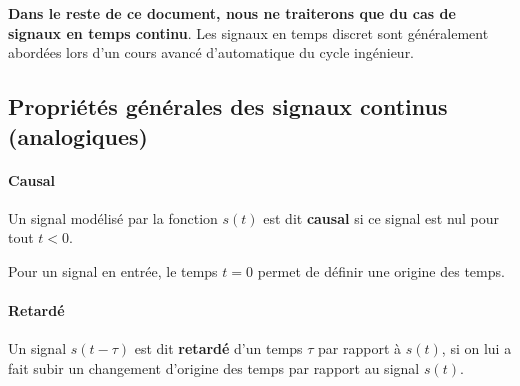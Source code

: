\textbf{Dans le reste de ce document, nous ne traiterons que
du cas de signaux en temps continu}. Les signaux en temps discret
sont généralement abordées lors d'un cours 
avancé d'automatique du cycle ingénieur.

\newpage
\subsection{Propriétés générales des signaux continus (analogiques)}

\paragraph{Causal}

Un signal modélisé par la fonction $s(t)$ est dit \textbf{causal}
si ce signal est nul pour tout $t<0$. 
{
\begin{figure}[htb]
\centering
{}

\end{figure}
\setlength\intextsep{0pt}
}
Pour un signal en entrée, le temps $t=0$ permet de 
définir une origine des temps.

%

%

%

\paragraph{Retardé}
Un signal $s(t-\tau)$ est dit \textbf{retardé} d'un temps $\tau$ 
par rapport à $s(t)$, si on lui a fait subir un changement
d'origine des temps par rapport au signal $s(t)$.
\begin{center}

\end{center}

